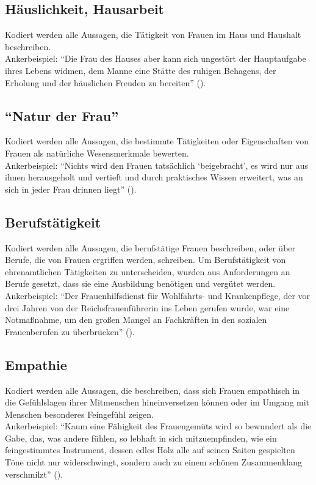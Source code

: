 \documentclass[12pt, titlepage=true, toc=bib]{scrartcl}
\begin{document}
\subsection*{Häuslichkeit, Hausarbeit}

Kodiert werden alle Aussagen, die Tätigkeit von Frauen im Haus und Haushalt beschreiben.\\
Ankerbeispiel: "`Die Frau des Hauses aber kann sich ungestört der Hauptaufgabe ihres Lebens widmen, dem Manne eine Stätte des ruhigen Behagens, der Erholung und der häuslichen Freuden zu bereiten"' (\cite[5]{friewart_japanisches_1941}).

\subsection*{"`Natur der Frau"'}

Kodiert werden alle Aussagen, die bestimmte Tätigkeiten oder Eigenschaften von Frauen als natürliche Wesensmerkmale bewerten.\\
Ankerbeispiel: \enquote{Nichts wird den Frauen tatsächlich \enquote{beigebracht}, es wird nur aus ihnen herausgeholt und vertieft und durch praktisches Wissen erweitert, was an sich in jeder Frau drinnen liegt} (\cite[775]{a._v._s._kameradschaft_1936}).

\subsection*{Berufstätigkeit}

Kodiert werden alle Aussagen, die berufstätige Frauen beschreiben, oder über Berufe, die von Frauen ergriffen werden, schreiben. Um Berufstätigkeit von ehrenamtlichen Tätigkeiten zu unterscheiden, wurden aus Anforderungen an Berufe gesetzt, dass sie eine Ausbildung benötigen und vergütet werden.\\
Ankerbeispiel: "`Der Frauenhilfsdienst für Wohlfahrts- und Krankenpflege, der vor drei Jahren von der Reichsfrauenführerin ins Leben gerufen wurde, war eine Notmaßnahme, um den großen Mangel an Fachkräften in den sozialen Frauenberufen zu überbrücken"' (\cite[22]{reimer_glucklich_1941}).

\subsection*{Empathie}

Kodiert werden alle Aussagen, die beschreiben, dass sich Frauen empathisch in die Gefühlslagen ihrer Mitmenschen hineinversetzen können oder im Umgang mit Menschen besonderes Feingefühl zeigen.\\
Ankerbeispiel: "`Kaum eine Fähigkeit des Frauengemüts wird so bewundert als die Gabe, das, was andere fühlen, so lebhaft in sich mitzuempfinden, wie ein feingestimmtes Instrument, dessen edles Holz alle auf seinen Saiten gespielten Töne nicht nur widerschwingt, sondern auch zu einem schönen Zusammenklang verschmilzt"' (\cite[36]{weinhandl_wie_1941}).
\end{document}
